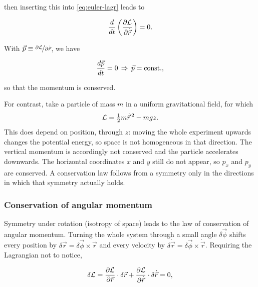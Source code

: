             then inserting this into \cref{eq:euler-lagr} leads to

            \begin{equation*}
                \frac{d}{dt}\left( \frac{\partial \mathcal{L}}{\partial \dot{\vec{r}}} \right) = 0.
            \end{equation*}

            With $ \vec{p} \equiv \nicefrac{\partial \mathcal{L}}{\partial \dot{\vec{r}}} $, we have

            \begin{equation*}
                \frac{d\vec{p}}{dt} = 0 \, \Rightarrow \, \vec{p}=\mathrm{const.},
            \end{equation*}

            so that the momentum is conserved.

            For contrast, take a particle of mass $m$ in a uniform gravitational field, for which
            \begin{equation*}
                \mathcal{L} = \tfrac{1}{2}m\dot{\vec{r}}^{\,2} - mgz .
            \end{equation*}
            This does depend on position, through $z$: moving the whole experiment upwards changes the potential energy, so space is not homogeneous in that direction. The vertical momentum is accordingly not conserved and the particle accelerates downwards. The horizontal coordinates $x$ and $y$ still do not appear, so $p_x$ and $p_y$ are conserved. A conservation law follows from a symmetry only in the directions in which that symmetry actually holds.

        \subsubsection{Conservation of angular momentum}

            Symmetry under rotation (isotropy of space) leads to the law of conservation of angular momentum. Turning the whole system through a small angle $\delta\vec{\phi}$ shifts every position by $\delta\vec{r} = \delta\vec{\phi} \times \vec{r}$ and every velocity by $\delta\dot{\vec{r}} = \delta\vec{\phi} \times \dot{\vec{r}}$. Requiring the Lagrangian not to notice,

            \begin{equation*}
                \delta\mathcal{L} = \frac{\partial \mathcal{L}}{\partial \vec{r}} \cdot \delta\vec{r} + \frac{\partial \mathcal{L}}{\partial \dot{\vec{r}}} \cdot \delta\dot{\vec{r}} = 0,
            \end{equation*}

